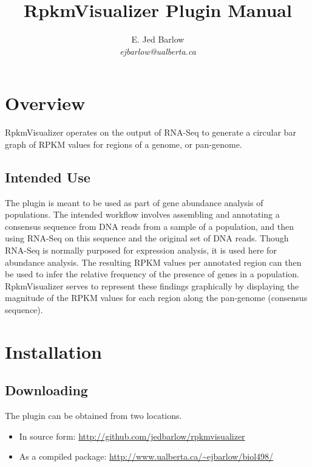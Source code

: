\documentclass[12pt,letterpaper]{article}
\author{
    E. Jed Barlow\\
    \textit{ejbarlow@ualberta.ca}
}
\title{RpkmVisualizer Plugin Manual}
\begin{document}
\maketitle

\hfill

\tableofcontents

\newpage
\section{Overview}


RpkmVisualizer operates on the output of RNA-Seq to generate a circular bar
graph of RPKM values for regions of a genome, or pan-genome.

\subsection{Intended Use}

The plugin is meant to be used as part of gene abundance analysis of
populations.  The intended workflow involves assembling and annotating a
consensus sequence from DNA reads from a sample of a population, and then using
RNA-Seq on this sequence and the original set of DNA reads.  Though RNA-Seq is
normally purposed for expression analysis, it is used here for abundance
analysis.  The resulting RPKM values per annotated region can then be used to
infer the relative frequency of the presence of genes in a population.
RpkmVisualizer serves to represent these findings graphically by displaying the
magnitude of the RPKM values for each region along the pan-genome (consensus
sequence).

\section{Installation}

\subsection{Downloading}

The plugin can be obtained from two locations.

\begin{itemize}
\item
    In source form: \url{http://github.com/jedbarlow/rpkmvisualizer}
\item
    As a compiled package: \url{http://www.ualberta.ca/~ejbarlow/biol498/}
\end{itemize}
\end{document}
